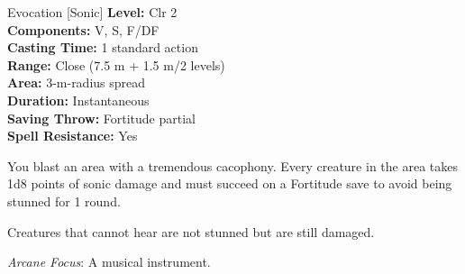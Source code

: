 {Evocation [Sonic]}
{
	\textbf{Level:}
	Clr 2\\
	\textbf{Components:}
	V, S, F/DF\\
	\textbf{Casting Time:}
	1 standard action\\
	\textbf{Range:}
	Close (7.5 m + 1.5 m/2 levels)\\
	\textbf{Area:}
	3-m-radius spread\\
	\textbf{Duration:}
	Instantaneous\\
	\textbf{Saving Throw:}
	Fortitude partial\\
	\textbf{Spell Resistance:}
	Yes\\
}
{
	You blast an area with a tremendous cacophony. Every creature in the area takes 1d8 points of sonic damage and must succeed on a Fortitude save to avoid being stunned for 1 round.

	Creatures that cannot hear are not stunned but are still damaged.

	\textit{Arcane Focus}:
	A musical instrument.

}
